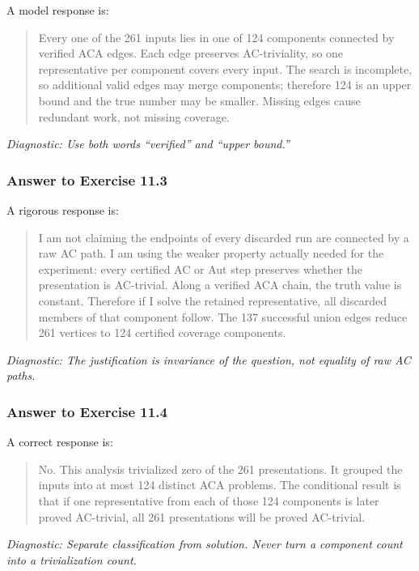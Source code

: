\documentclass[11pt]{article}
\theoremstyle{definition}
\theoremstyle{remark}
\newcommand{\diagnostic}[1]{\par\smallskip\textit{Diagnostic: #1}}
\begin{document}
A model response is:

\begin{quote}
Every one of the 261 inputs lies in one of 124 components connected by
verified ACA edges.  Each edge preserves AC-triviality, so one
representative per component covers every input.  The search is incomplete,
so additional valid edges may merge components; therefore 124 is an upper
bound and the true number may be smaller.  Missing edges cause redundant
work, not missing coverage.
\end{quote}

\diagnostic{Use both words ``verified'' and ``upper bound.''}

\subsubsection*{Answer to Exercise 11.3}

A rigorous response is:

\begin{quote}
I am not claiming the endpoints of every discarded run are connected by a
raw AC path.  I am using the weaker property actually needed for the
experiment: every certified AC or Aut step preserves whether the
presentation is AC-trivial.  Along a verified ACA chain, the truth value is
constant.  Therefore if I solve the retained representative, all discarded
members of that component follow.  The 137 successful union edges reduce
261 vertices to 124 certified coverage components.
\end{quote}

\diagnostic{The justification is invariance of the question, not equality
of raw AC paths.}

\subsubsection*{Answer to Exercise 11.4}

A correct response is:

\begin{quote}
No.  This analysis trivialized zero of the 261 presentations.  It grouped
the inputs into at most 124 distinct ACA problems.  The conditional result
is that if one representative from each of those 124 components is later
proved AC-trivial, all 261 presentations will be proved AC-trivial.
\end{quote}

\diagnostic{Separate classification from solution.  Never turn a component
count into a trivialization count.}
\end{document}
